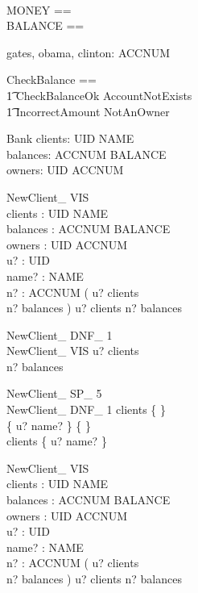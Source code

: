 \documentclass{article}
\begin{document}
\begin{zed}
 \\
MONEY == \nat \\
BALANCE == \nat
\end{zed}


\begin{axdef}
gates, obama, clinton: ACCNUM
\end{axdef}

\begin{zed}
CheckBalance == \\
  \t1 CheckBalanceOk \lor AccountNotExists \\
  \t1 \lor IncorrectAmount \lor NotAnOwner
\end{zed}


\begin{schema}{Bank}
clients: UID \pfun NAME \\
balances: ACCNUM \pfun BALANCE \\
owners: UID \rel ACCNUM
\end{schema}


\begin{schema}{NewClient\_ VIS}\\
 clients : UID \pfun NAME \\
 balances : ACCNUM \pfun BALANCE \\
 owners : UID \rel ACCNUM \\
 u? : UID \\
 name? : NAME \\
 n? : ACCNUM 
\where
 ( u? \notin \dom clients \\
 n? \notin \dom balances ) \lor u? \in \dom clients \lor n? \in \dom balances
\end{schema}

\begin{schema}{NewClient\_ DNF\_ 1}\\
 NewClient\_ VIS 
\where
 u? \notin \dom clients \\
 n? \notin \dom balances
\end{schema}

\begin{schema}{NewClient\_ SP\_ 5}\\
 NewClient\_ DNF\_ 1 
\where
 clients \neq \{ \} \\
 \{ u? \mapsto name? \} \neq \{ \} \\
 clients \subset \{ u? \mapsto name? \}
\end{schema}

\begin{schema}{NewClient\_ VIS}\\
 clients : UID \pfun NAME \\
 balances : ACCNUM \pfun BALANCE \\
 owners : UID \rel ACCNUM \\
 u? : UID \\
 name? : NAME \\
 n? : ACCNUM 
\where
 ( u? \notin \dom clients \\
 n? \notin \dom balances ) \lor u? \in \dom clients \lor n? \in \dom balances
\end{schema}
\end{document}
